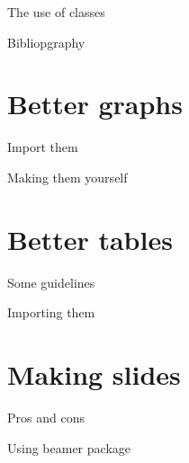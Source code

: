 \documentclass[ignorenonframetext,]{beamer}
\begin{document}
\begin{frame}{The use of classes}

\end{frame}

\begin{frame}{Bibliopgraphy}

\end{frame}

\section{Better graphs}\label{better-graphs}

\begin{frame}{Import them}

\end{frame}

\begin{frame}{Making them yourself}

\end{frame}

\section{Better tables}\label{better-tables}

\begin{frame}{Some guidelines}

\end{frame}

\begin{frame}{Importing them}

\end{frame}

\section{Making slides}\label{making-slides}

\begin{frame}{Pros and cons}

\end{frame}

\begin{frame}{Using beamer package}

\end{frame}
\end{document}
